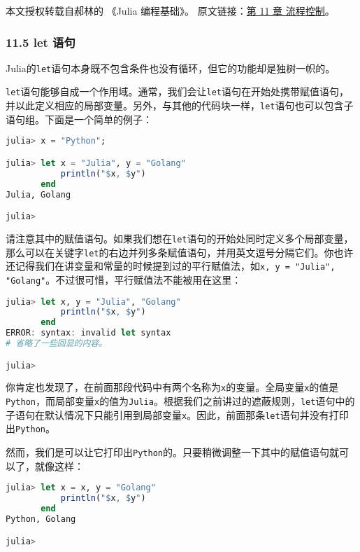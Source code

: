 
本文授权转载自郝林的 《Julia 编程基础》。 原文链接：\href{https://github.com/hyper0x/JuliaBasics/blob/master/book/ch11.md}{第 11 章 流程控制}。


\subsubsection{11.5 let 语句}

Julia的\verb|let|语句本身既不包含条件也没有循环，但它的功能却是独树一帜的。

\verb|let|语句能够自成一个作用域。通常，我们会让\verb|let|语句在开始处携带赋值语句，并以此定义相应的局部变量。另外，与其他的代码块一样，\verb|let|语句也可以包含子语句组。下面是一个简单的例子：

\begin{lstlisting}[language=julia]
julia> x = "Python";

julia> let x = "Julia", y = "Golang"
           println("$x, $y")
       end
Julia, Golang

julia> 
\end{lstlisting}

请注意其中的赋值语句。如果我们想在\verb|let|语句的开始处同时定义多个局部变量，那么可以在关键字\verb|let|的右边并列多条赋值语句，并用英文逗号分隔它们。你也许还记得我们在讲变量和常量的时候提到过的平行赋值法，如\verb|x, y = "Julia", "Golang"|。不过很可惜，平行赋值法不能被用在这里：

\begin{lstlisting}[language=julia]
julia> let x, y = "Julia", "Golang"
           println("$x, $y")
       end
ERROR: syntax: invalid let syntax
# 省略了一些回显的内容。

julia> 
\end{lstlisting}

你肯定也发现了，在前面那段代码中有两个名称为\verb|x|的变量。全局变量\verb|x|的值是\verb|Python|，而局部变量\verb|x|的值为\verb|Julia|。根据我们之前讲过的遮蔽规则，\verb|let|语句中的子语句在默认情况下只能引用到局部变量\verb|x|。因此，前面那条\verb|let|语句并没有打印出\verb|Python|。

然而，我们是可以让它打印出\verb|Python|的。只要稍微调整一下其中的赋值语句就可以了，就像这样：

\begin{lstlisting}[language=julia]
julia> let x = x, y = "Golang"
           println("$x, $y")
       end
Python, Golang

julia> 
\end{lstlisting}

